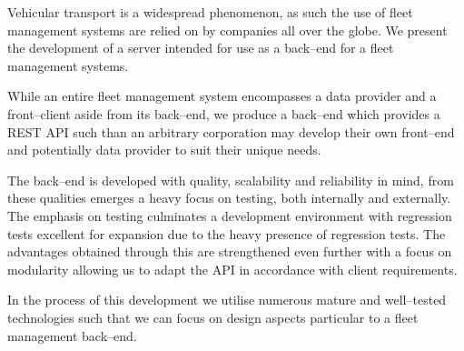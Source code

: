 Vehicular transport is a widespread phenomenon, as such the use of fleet management systems are relied on by companies all over the globe.
We present the development of a server intended for use as a back--end for a fleet management systems.

\bigskip \noindent
While an entire fleet management system encompasses a data provider and a front--client aside from its back--end, we produce a back--end which provides a REST API such than an arbitrary corporation may develop their own front--end and potentially data provider to suit their unique needs.

\bigskip \noindent
The back--end is developed with quality, scalability and reliability in mind, from these qualities emerges a heavy focus on testing, both internally and externally.
The emphasis on testing culminates a development environment with regression tests excellent for expansion due to the heavy presence of regression tests.
The advantages obtained through this are strengthened even further with a focus on modularity allowing us to adapt the API in accordance with client requirements.

\bigskip \noindent
In the process of this development we utilise numerous mature and well--tested technologies such that we can focus on design aspects particular to a fleet management back--end.
